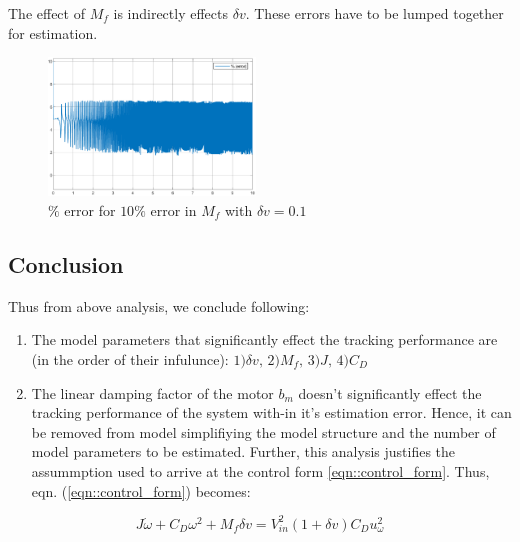 The effect of $M_f$ is indirectly effects $\delta v$. These errors have to be
lumped together for estimation.
    \begin{figure}[H]
        \centering
        \includegraphics[width = 0.49\textwidth]{figs/par_var/m_f.eps}
        \caption{$\%$ error for $10\%$ error in $M_f$ with $\delta v=0.1$}
    \end{figure}


\subsection{Conclusion}
Thus from above analysis, we conclude following:

\begin{enumerate}
\item The model parameters that significantly effect the tracking performance
are (in the order of their infulunce): $1) \delta v, \, 2) M_f, \, 3)J, \, 4) C_D$
\item The linear damping factor of the motor $b_m$ doesn't significantly effect
the tracking performance of the system with-in it's estimation error. Hence, it can be removed from model simplifiying the model structure and the number of
model parameters to be estimated. Further, this analysis justifies the
assummption used to arrive at the control form \ref{eqn::control_form}. Thus, eqn. (\ref{eqn::control_form}) becomes:
\end{enumerate}

\begin{equation}\label{eqn::no_bm_ctrl_form}
    J \dot \omega + C_D \omega^2 + M_f \delta v = V_{in}^2 (1 + \delta v) C_D u_\omega^2
\end{equation}
